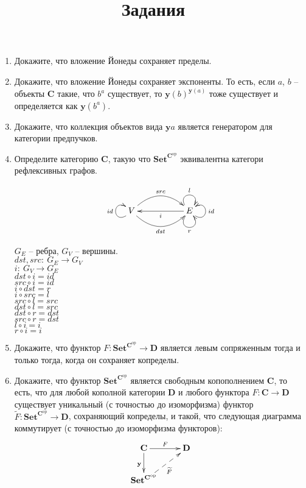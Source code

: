 \documentclass[draft]{article}
\newcommand{\cat}[1]{\mathbf{#1}}
\renewcommand{\C}{\cat{C}}
\newcommand{\D}{\cat{D}}
\newcommand{\y}{\cat{y}}
\newcommand{\Set}{\cat{Set}}
\newcommand{\fs}[1]{\mathrm{#1}}
\newcommand{\op}{\fs{op}}
\begin{document}
\title{Задания}
\maketitle

\begin{enumerate}

\item Докажите, что вложение Йонеды сохраняет пределы.

\item Докажите, что вложение Йонеды сохраняет экспоненты. То есть, если $a$, $b$ -- объекты $\C$ такие, что $b^a$ существует,
то $\y(b)^{\y(a)}$ тоже существует и определяется как $\y(b^a)$.

\item Докажите, что коллекция объектов вида $\y a$ является генератором для категории предпучков.

\item Определите категорию $\C$, такую что $\Set^{\C^\op}$ эквивалентна категори рефлексивных графов.

\[
\xymatrix{
	V 
	\ar@(ld,lu)^{id}
	\ar@/^1.5pc/[rr]^{src}
	\ar@/_1.5pc/[rr]_{dst}
	&& 
	E 
	\ar@(rd,ru)_{id}	
	\ar@(ul,ur)^{l}	
	\ar@(dl,dr)_{r}	
	\ar[ll]^{i}
}
\]

$G_E$ -- ребра, $G_V$ -- вершины.\\
$dst, src: ~G_E \to G_V$ \\
$i: ~G_V \to G_E$\\
$dst \circ i = id$\\
$src \circ i = id$\\
$i \circ dst = r$\\
$i \circ src = l$\\
$src \circ l = src$\\
$dst \circ l = src$\\
$dst \circ r = dst$\\
$src \circ r = dst$\\
$l \circ i = i$\\
$r \circ i = i$


\item Докажите, что функтор $F : \Set^{\C^\op} \to \D$ является левым сопряженным тогда и только тогда, когда он сохраняет копределы.

\item Докажите, что функтор $\Set^{\C^\op}$ является свободным копополнением $\C$, то есть, что для любой кополной категории $\D$ и любого функтора $F : \C \to \D$
существует уникальный (с точностью до изоморфизма) функтор $\widetilde{F} : \Set^{\C^\op} \to \D$, сохраняющий копределы, и такой, что следующая диаграмма коммутирует (с точностью до изоморфизма функторов):
\[ \xymatrix{ \C \ar[r]^F \ar[d]_{\cat{y}}                 & \D \\
              \Set^{\C^\op} \ar@{-->}[ur]_{\widetilde{F}}
            } \]

\end{enumerate}
\end{document}
